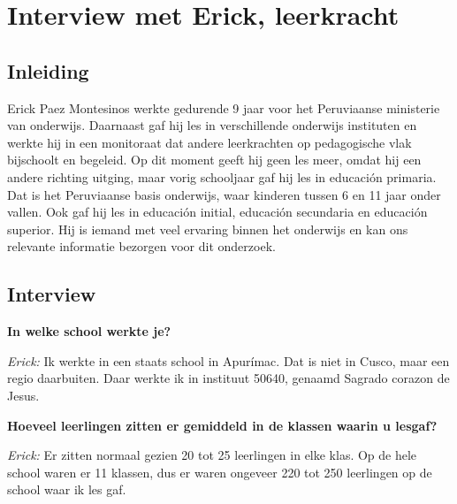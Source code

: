 
\chapter{Interview met Erick, leerkracht}
\label{ch:interviewMetErick}

\section{Inleiding}
Erick Paez Montesinos werkte gedurende 9 jaar voor het Peruviaanse ministerie van onderwijs. Daarnaast gaf hij les in verschillende onderwijs instituten en werkte hij in een monitoraat dat andere leerkrachten op pedagogische vlak bijschoolt en begeleid. Op dit moment geeft hij geen les meer, omdat hij een andere richting uitging, maar vorig schooljaar gaf hij les in educación primaria. Dat is het Peruviaanse basis onderwijs, waar kinderen tussen 6 en 11 jaar onder vallen. \autocite{Nuffic2015} Ook gaf hij les in educación initial, educación secundaria en educación superior. Hij is iemand met veel ervaring binnen het onderwijs en kan ons relevante informatie bezorgen voor dit onderzoek.


\section{Interview}

\textbf{In welke school werkte je?}

\textit{Erick:} Ik werkte in een staats school in Apurímac. Dat is niet in Cusco, maar een regio daarbuiten. Daar werkte ik in instituut 50640, genaamd Sagrado corazon de Jesus.

\textbf{Hoeveel leerlingen zitten er gemiddeld in de klassen waarin u lesgaf?}

\textit{Erick:} Er zitten normaal gezien 20 tot 25 leerlingen in elke klas. Op de hele school waren er 11 klassen, dus er waren ongeveer 220 tot 250 leerlingen op de school waar ik les gaf. %

